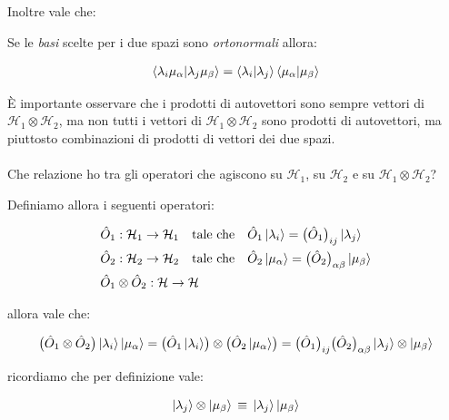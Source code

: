 	Inoltre vale che:
	
\begin{nb}

	Se le \textit{basi} scelte per i due spazi sono \textit{ortonormali} allora:
	
\begin{align*}
	\braket{\lambda_i \mu_{\alpha}}{\lambda_j \mu_{\beta}} = \braket{\lambda_i}{\lambda_j} \braket{\mu_{\alpha}}{\mu_{\beta}}
\end{align*}

\end{nb}

	È importante osservare che i prodotti di autovettori sono sempre vettori di $\mathcal{H}_1 \otimes \mathcal{H}_2$, ma non tutti i vettori di $\mathcal{H}_1 \otimes \mathcal{H}_2$ sono prodotti di autovettori, ma piuttosto combinazioni di prodotti di vettori dei due spazi.
	\\
	\\
	Che relazione ho tra gli operatori che agiscono su $\mathcal{H}_1$, su $\mathcal{H}_2$ e su $\mathcal{H}_1 \otimes \mathcal{H}_2$?

\begin{nb}
	Definiamo allora i seguenti operatori:

\begin{align*}
	& \hat{O}_1 : \mathcal{H}_1 \to \mathcal{H}_1 \quad \text{tale che} \quad \hat{O}_1 \ket{\lambda_i} = \qty\big(\hat{O}_1)_{ij} \ket{\lambda_j} \\
	& \hat{O}_2 : \mathcal{H}_2 \to \mathcal{H}_2 \quad \text{tale che} \quad \hat{O}_2 \ket{\mu_{\alpha}} = \qty\big(\hat{O}_2)_{\alpha \beta} \ket{\mu_{\beta}} \\
	& \hat{O}_1 \otimes \hat{O}_2 : \mathcal{H} \to \mathcal{H}
\end{align*}
\end{nb}

	allora vale che:
	
\begin{align*}
	\qty\big(\hat{O}_1 \otimes \hat{O}_2) \ket{\lambda_i} \ket{\mu_{\alpha}} = \qty\big(\hat{O}_1 \ket{\lambda_i}) \otimes \qty\big(\hat{O}_2 \ket{\mu_{\alpha}}) =  \qty\big(\hat{O}_1)_{ij} \qty\big(\hat{O}_2)_{\alpha \beta} \ket{\lambda_j} \otimes \ket{\mu_{\beta}}
\end{align*}

	ricordiamo che per definizione vale:
	
\begin{align*}
	\ket{\lambda_j} \otimes \ket{\mu_{\beta}} \, \equiv \, \ket{\lambda_j}\ket{\mu_{\beta}} 
\end{align*}

